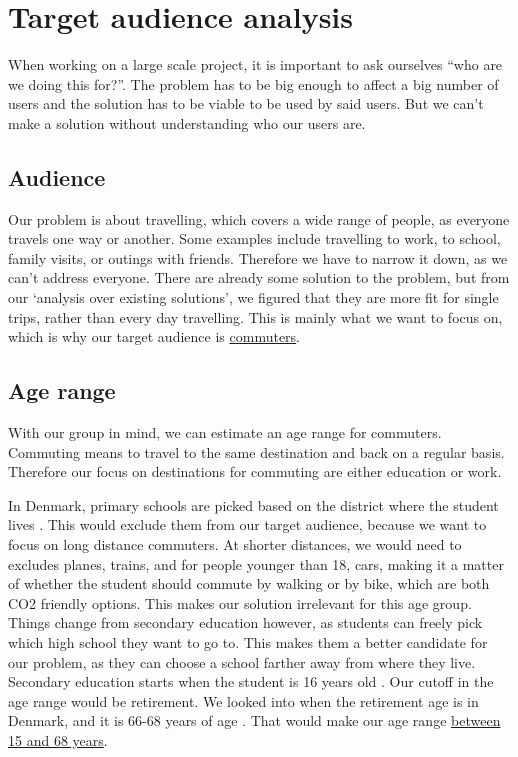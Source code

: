 \section{Target audience analysis}

When working on a large scale project, it is important to ask ourselves ``who are we doing this for?''. The problem has to be big enough to affect a big number of users and the solution has to be viable to be used by said users. But we can't make a solution without understanding who our users are. 

\subsection{Audience}

Our problem is about travelling, which covers a wide range of people, as everyone travels one way or another. Some examples include travelling to work, to school, family visits, or outings with friends. Therefore we have to narrow it down, as we can't address everyone. There are already some solution to the problem, but from our `analysis over existing solutions', we figured that they are more fit for single trips, rather than every day travelling. This is mainly what we want to focus on, which is why our target audience is \underline{commuters}. 

\subsection{Age range}

With our group in mind, we can estimate an age range for commuters. Commuting means to travel to the same destination and back on a regular basis. Therefore our focus on destinations for commuting are either education or work. 

In Denmark, primary schools are picked based on the district where the student lives \cite{primary_school}. This would exclude them from our target audience, because we want to focus on long distance commuters. At shorter distances, we would need to excludes planes, trains, and for people younger than 18, cars, making it a matter of whether the student should commute by walking or by bike, which are both CO2 friendly options. This makes our solution irrelevant for this age group. Things change from secondary education however, as students can freely pick which high school they want to go to. This makes them a better candidate for our problem, as they can choose a school farther away from where they live. Secondary education starts when the student is 16 years old \cite{secondary_school}. Our cutoff in the age range would be retirement. We looked into when the retirement age is in Denmark, and it is 66-68 years of age \cite{retirement}. That would make our age range \underline{between 15 and 68 years}.

